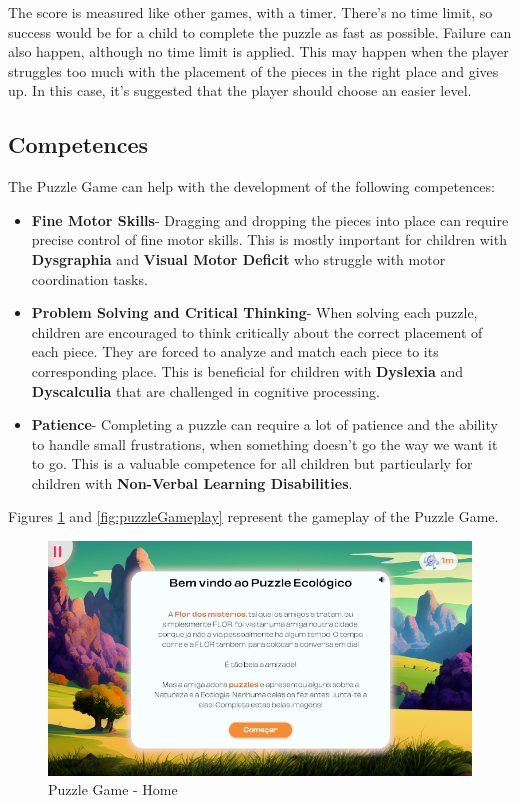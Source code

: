 The score is measured like other games, with a timer. There's no time limit, so success would be for a child to complete the puzzle as fast as possible. Failure can also happen, although no time limit is applied. This may happen when the player struggles too much with the placement of the pieces in the right place and gives up. In this case, it's suggested that the player should choose an easier level.

\subsection*{Competences}

The Puzzle Game can help with the development of the following competences:

\begin{itemize}
    \item \textbf{Fine Motor Skills}- Dragging and dropping the pieces into place can require precise control of fine motor skills. This is mostly important for children with \textbf{Dysgraphia} and \textbf{Visual Motor Deficit} who struggle with motor coordination tasks.

    \item \textbf{Problem Solving and Critical Thinking}- When solving each puzzle, children are encouraged to think critically about the correct placement of each piece. They are forced to analyze and match each piece to its corresponding place. This is beneficial for children with \textbf{Dyslexia} and \textbf{Dyscalculia} that are challenged in cognitive processing.
    
    \item \textbf{Patience}- Completing a puzzle can require a lot of patience and the ability to handle small frustrations, when something doesn't go the way we want it to go. This is a valuable competence for all children but particularly for children with \textbf{Non-Verbal Learning Disabilities}.
\end{itemize}

Figures \ref{fig:puzzleHome} and \ref{fig:puzzleGameplay} represent the gameplay of the Puzzle Game.

\begin{figure}[H]
    \centering
    \includegraphics[width=0.9\linewidth]{Chapters/gameplay/new_screens/puzzle_home.png}
    \caption{Puzzle Game - Home}
    \label{fig:puzzleHome}    
\end{figure}

